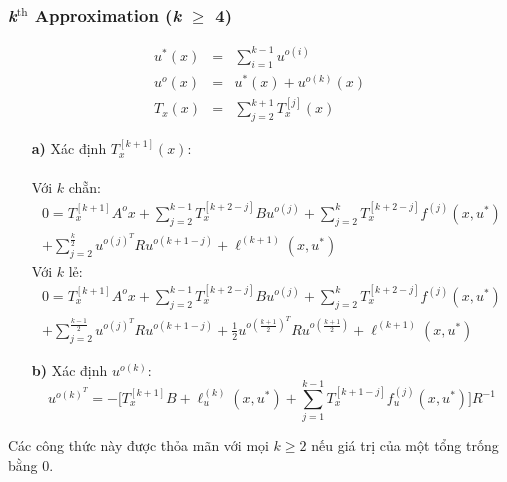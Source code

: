 \documentclass[12pt,a4paper]{report}
\begin{document}
\subsubsection{\textit{k}$^{\text{th}}$ Approximation (\textit{k} $\geq$ 4)}
\begin{eqnarray}
	u^*(x) &=& \sum_{i=1}^{k-1}u^{o(i)} \nonumber\\ u^{o}(x) &=& u^*(x) + u^{o(k)}(x) \nonumber\\ T_x(x) &=& \sum_{j=2}^{k+1}T_x^{[j]}(x) \nonumber
\end{eqnarray}
\begin{itemize}
	\item[\textbf{a)}] Xác định $T_x^{[k+1]}(x)$:\\\\Với $k$ chẵn:
 \begin{equation}
	\begin{split}
	 0 = T_x^{[k+1]}A^ox + \sum_{j=2}^{k-1}T_x^{[k+2-j]}Bu^{o(j)} + \sum_{j=2}^{k}T_x^{[k+2-j]}f^{(j)}(x, u^*) \\+ \sum_{j=2}^{\frac{k}{2}}u^{o(j)^T}Ru^{o(k+1-j)} + \ell^{(k+1)}(x, u^*)
	\end{split} \nonumber
	\end{equation} Với $k$ lẻ:
	\begin{equation}
	\begin{split}
	0 = T_x^{[k+1]}A^ox + \sum_{j=2}^{k-1}T_x^{[k+2-j]}Bu^{o(j)} + \sum_{j=2}^{k}T_x^{[k+2-j]}f^{(j)}(x, u^*) \\ + \sum_{j=2}^{\frac{k-1}{2}}u^{o(j)^T}Ru^{o(k+1-j)} + \frac{1}{2}
		u^{o(\frac{k+1}{2})^T}Ru^{o(\frac{k+1}{2})} + \ell^{(k+1)}(x, u^*) 		
		\end{split} \nonumber
		\end{equation}
	\item[\textbf{b)}] Xác định $u^{o(k)}$: $$u^{o(k)^T} = - \Big[T_x^{[k+1]}B + \ell_u^{(k)}(x, u^*) + \sum_{j=1}^{k-1}T_x^{[k+1-j]}f_u^{(j)}(x, u^*)\Big]R^{-1}$$
\end{itemize}
Các công thức này được thỏa mãn với mọi $k \geq 2$ nếu giá trị của một tổng trống bằng 0.
\end{document}

